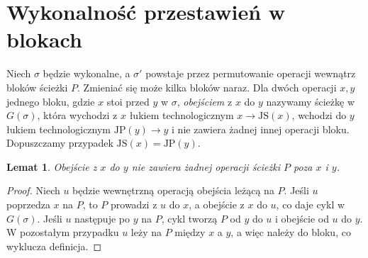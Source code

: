 \documentclass[10pt,twocolumn]{article}
\newtheorem{lemma}{Lemat}
\newcommand{\JP}{\mathrm{JP}}
\newcommand{\JS}{\mathrm{JS}}
\begin{document}
\section{Wykonalność przestawień w blokach}\label{sec:feas}

Niech $\sigma$ będzie wykonalne, a $\sigma'$ powstaje przez permutowanie
operacji wewnątrz bloków ścieżki $P$. Zmieniać się może kilka bloków
naraz. Dla dwóch operacji $x,y$ jednego bloku, gdzie $x$ stoi przed $y$
w $\sigma$, \emph{obejściem} z $x$ do $y$ nazywamy ścieżkę w $G(\sigma)$,
która wychodzi z $x$ łukiem technologicznym $x\to\JS(x)$, wchodzi do $y$
łukiem technologicznym $\JP(y)\to y$ i nie zawiera żadnej innej operacji
bloku. Dopuszczamy przypadek $\JS(x)=\JP(y)$.

\begin{lemma}\label{le:clean}
Obejście z $x$ do $y$ nie zawiera żadnej operacji ścieżki $P$ poza $x$
i $y$.
\end{lemma}
\begin{proof}
Niech $u$ będzie wewnętrzną operacją obejścia leżącą na $P$. Jeśli $u$
poprzedza $x$ na $P$, to $P$ prowadzi z $u$ do $x$, a obejście z $x$ do
$u$, co daje cykl w $G(\sigma)$. Jeśli $u$ następuje po $y$ na $P$, cykl
tworzą $P$ od $y$ do $u$ i obejście od $u$ do $y$. W pozostałym przypadku
$u$ leży na $P$ między $x$ a $y$, a więc należy do bloku, co wyklucza
definicja.
\end{proof}
\end{document}
